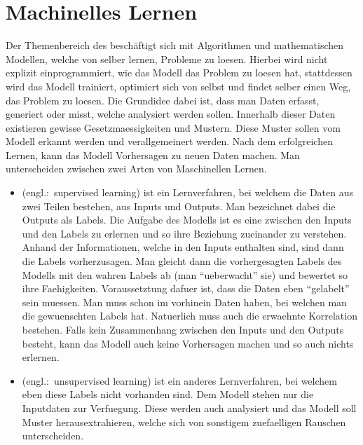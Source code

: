 \chapter{Machinelles Lernen}

Der Themenbereich des  beschäftigt sich mit Algorithmen und mathematischen Modellen, welche von selber lernen, Probleme zu loesen.
Hierbei wird nicht explizit einprogrammiert, wie das Modell das Problem zu loesen
hat, stattdessen wird das Modell trainiert, optimiert sich von selbst und findet selber
einen Weg, das Problem zu loesen.
Die Grundidee dabei ist, dass man Daten erfasst, generiert oder misst, welche
analysiert werden sollen. Innerhalb dieser Daten existieren gewisse
Gesetzmaessigkeiten und Mustern. Diese Muster sollen vom Modell
erkannt werden und verallgemeinert werden. Nach dem erfolgreichen Lernen,
kann das Modell Vorhersagen zu neuen Daten machen.
\para{}
Man unterscheiden zwischen zwei Arten von Maschinellen Lernen.
\begin{itemize}
\item{
     (engl.:\ supervised learning) ist ein
    Lernverfahren, bei welchem die Daten aus zwei Teilen bestehen, aus Inputs und
    Outputs. Man bezeichnet dabei die Outputs als Labels. Die Aufgabe des Modells
    ist es eine  zwischen den Inputs und den Labels zu
    erlernen und so ihre Beziehung zueinander zu verstehen.
    Anhand der Informationen, welche in den Inputs enthalten
    sind, sind dann die Labels vorherzusagen. Man gleicht dann die
    vorhergesagten Labels des Modells mit den wahren Labels ab (man ``ueberwacht'' sie) und bewertet so ihre Faehigkeiten.
    \para{}
    Voraussetztung dafuer ist, dass die Daten eben ``gelabelt'' sein muessen.
    Man muss schon im vorhinein Daten haben, bei welchen man die gewuenschten
    Labels hat. Natuerlich muss auch die erwaehnte Korrelation bestehen. Falls
    kein Zusammenhang zwischen den Inputs und den Outputs besteht, kann das
    Modell auch keine Vorhersagen machen und so auch nichts erlernen.
  }
\item{
     (engl.:\ unsupervised learning) ist ein anderes
    Lernverfahren, bei welchem eben diese Labels nicht vorhanden sind. Dem
    Modell stehen nur die Inputdaten zur Verfuegung. Diese werden auch analysiert
    und das Modell soll Muster herausextrahieren, welche sich von sonstigem
    zuefaelligen Rauschen unterscheiden.
  }
\end{itemize}


